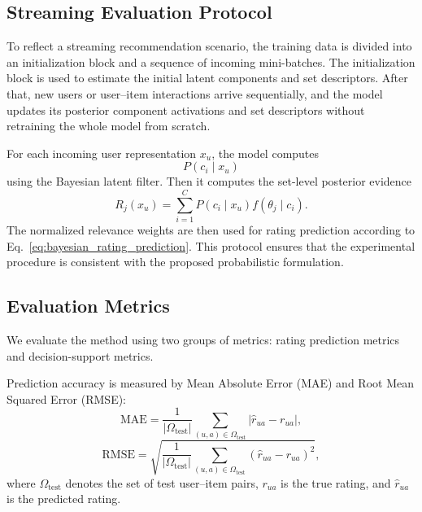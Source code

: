 \documentclass{article}
\theoremstyle{plain}
\theoremstyle{definition}
\theoremstyle{remark}
\begin{document}
\subsection{Streaming Evaluation Protocol}
\label{subsec:streaming_protocol}

To reflect a streaming recommendation scenario, the training data is divided into an initialization block and a sequence of incoming mini-batches. The initialization block is used to estimate the initial latent components and set descriptors. After that, new users or user--item interactions arrive sequentially, and the model updates its posterior component activations and set descriptors without retraining the whole model from scratch.

For each incoming user representation \(x_u\), the model computes
\[
P(c_i\mid x_u)
\]
using the Bayesian latent filter. Then it computes the set-level posterior evidence
\[
R_j(x_u)
=
\sum_{i=1}^{C}
P(c_i\mid x_u)f(\theta_j\mid c_i).
\]
The normalized relevance weights are then used for rating prediction according to Eq.~\eqref{eq:bayesian_rating_prediction}. This protocol ensures that the experimental procedure is consistent with the proposed probabilistic formulation.

\subsection{Evaluation Metrics}
\label{subsec:evaluation_metrics}

We evaluate the method using two groups of metrics: rating prediction metrics and decision-support metrics.

Prediction accuracy is measured by Mean Absolute Error (MAE) and Root Mean Squared Error (RMSE):
\begin{equation}
	\label{eq:mae}
	\mathrm{MAE}
	=
	\frac{1}{|\Omega_{\mathrm{test}}|}
	\sum_{(u,a)\in\Omega_{\mathrm{test}}}
	\left|
	\widehat r_{ua}-r_{ua}
	\right|,
\end{equation}
\begin{equation}
	\label{eq:rmse}
	\mathrm{RMSE}
	=
	\sqrt{
		\frac{1}{|\Omega_{\mathrm{test}}|}
		\sum_{(u,a)\in\Omega_{\mathrm{test}}}
		\left(
		\widehat r_{ua}-r_{ua}
		\right)^2
	},
\end{equation}
where \(\Omega_{\mathrm{test}}\) denotes the set of test user--item pairs, \(r_{ua}\) is the true rating, and \(\widehat r_{ua}\) is the predicted rating.
\end{document}
